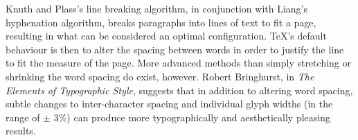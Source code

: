 Knuth and Plass's line breaking algorithm\cite{Knuth1981}, in conjunction with Liang's hyphenation
algorithm\cite{Liang1983}, breaks paragraphs into lines of text to fit a page, resulting in what can be
considered an optimal configuration. \TeX 's default behaviour is then to alter the spacing
between words in order to justify the line to fit the measure of the page. More advanced methods
than simply stretching or shrinking the word spacing do exist, however. Robert Bringhurst, in
\emph{The Elements of Typographic Style}\cite{Bringhurst2008}, suggests that in addition to altering
word spacing, subtle changes to inter-character spacing and individual glyph widths (in the range of
$\pm$ 3\%) can produce more typographically and aesthetically pleasing results. %




